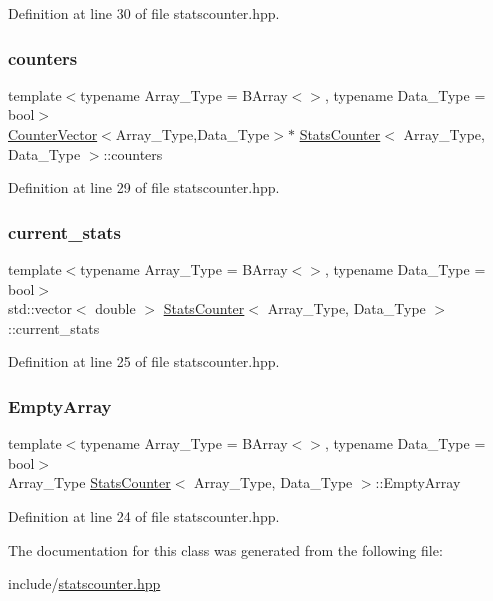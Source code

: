 Definition at line 30 of file statscounter.\+hpp.

\mbox{\label{class_stats_counter_a3115a96cbc1b35483a240b1fdc84eab6}} 
\subsubsection{\texorpdfstring{counters}{counters}}
{\footnotesize\ttfamily template$<$typename Array\+\_\+\+Type = B\+Array$<$$>$, typename Data\+\_\+\+Type = bool$>$ \\
\hyperlink{class_counter_vector}{Counter\+Vector}$<$Array\+\_\+\+Type,Data\+\_\+\+Type$>$$\ast$ \hyperlink{class_stats_counter}{Stats\+Counter}$<$ Array\+\_\+\+Type, Data\+\_\+\+Type $>$\+::counters}



Definition at line 29 of file statscounter.\+hpp.

\mbox{\label{class_stats_counter_af98192f893280a2681a59f4b73051ca3}} 
\subsubsection{\texorpdfstring{current\+\_\+stats}{current\_stats}}
{\footnotesize\ttfamily template$<$typename Array\+\_\+\+Type = B\+Array$<$$>$, typename Data\+\_\+\+Type = bool$>$ \\
std\+::vector$<$ double $>$ \hyperlink{class_stats_counter}{Stats\+Counter}$<$ Array\+\_\+\+Type, Data\+\_\+\+Type $>$\+::current\+\_\+stats}



Definition at line 25 of file statscounter.\+hpp.

\mbox{\label{class_stats_counter_a026304bec607994865ba5bb4e18f9104}} 
\subsubsection{\texorpdfstring{Empty\+Array}{EmptyArray}}
{\footnotesize\ttfamily template$<$typename Array\+\_\+\+Type = B\+Array$<$$>$, typename Data\+\_\+\+Type = bool$>$ \\
Array\+\_\+\+Type \hyperlink{class_stats_counter}{Stats\+Counter}$<$ Array\+\_\+\+Type, Data\+\_\+\+Type $>$\+::Empty\+Array}



Definition at line 24 of file statscounter.\+hpp.



The documentation for this class was generated from the following file\+:\begin{DoxyCompactItemize}
\item 
include/\hyperlink{statscounter_8hpp}{statscounter.\+hpp}\end{DoxyCompactItemize}
